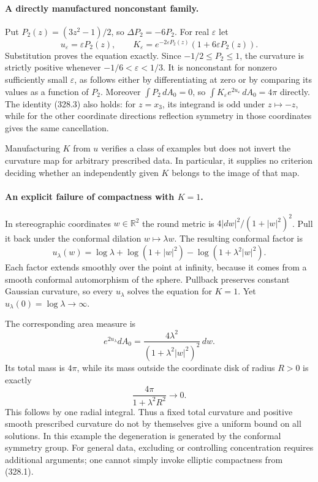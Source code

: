 \documentclass[11pt]{article}
\begin{document}
\paragraph{A directly manufactured nonconstant family.}
Put $P_2(z)=(3z^2-1)/2$, so $\Delta P_2=-6P_2$. For real
$\varepsilon$ let
\[
 u_\varepsilon=\varepsilon P_2(z),\qquad
 K_\varepsilon=e^{-2\varepsilon P_2(z)}
                           (1+6\varepsilon P_2(z)).
 \tag{328.6}
\]
Substitution proves the equation exactly. Since $-1/2\leq P_2\leq1$,
the curvature is strictly positive whenever
$-1/6<\varepsilon<1/3$. It is nonconstant for nonzero sufficiently
small $\varepsilon$, as follows either by differentiating at zero
or by comparing its values as a function of $P_2$.
Moreover $\int P_2\,dA_0=0$, so
$\int K_\varepsilon e^{2u_\varepsilon}\,dA_0=4\pi$ directly.
The identity (328.3) also holds: for $z=x_3$, its integrand is odd
under $z\mapsto-z$, while for the other coordinate directions
reflection symmetry in those coordinates gives the same cancellation.

Manufacturing $K$ from $u$ verifies a class of examples but does not
invert the curvature map for arbitrary prescribed data. In particular,
it supplies no criterion deciding whether an independently given
$K$ belongs to the image of that map.

\paragraph{An explicit failure of compactness with $K=1$.}
In stereographic coordinates $w\in\mathbb R^2$ the round metric is
$4|dw|^2/(1+|w|^2)^2$. Pull it back under the conformal dilation
$w\mapsto\lambda w$. The resulting conformal factor is
\[
 u_\lambda(w)=\log\lambda+\log(1+|w|^2)
                         -\log(1+\lambda^2|w|^2).
 \tag{328.7}
\]
Each factor extends smoothly over the point at infinity, because it
comes from a smooth conformal automorphism of the sphere. Pullback
preserves constant Gaussian curvature, so every $u_\lambda$ solves
the equation for $K=1$. Yet $u_\lambda(0)=\log\lambda\to\infty$.

The corresponding area measure is
\[
 e^{2u_\lambda}dA_0
       =\frac{4\lambda^2}{(1+\lambda^2|w|^2)^2}\,dw.
\]
Its total mass is $4\pi$, while its mass outside the coordinate
disk of radius $R>0$ is exactly
\[
 \frac{4\pi}{1+\lambda^2R^2}\longrightarrow0.
 \tag{328.8}
\]
This follows by one radial integral. Thus a fixed total curvature
and positive smooth prescribed curvature do not by themselves give
a uniform bound on all solutions. In this example the degeneration
is generated by the conformal symmetry group. For general data,
excluding or controlling concentration requires additional arguments;
one cannot simply invoke elliptic compactness from (328.1).
\end{document}
